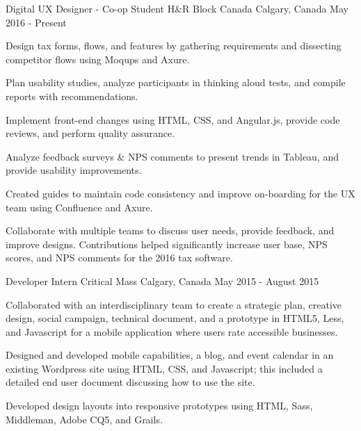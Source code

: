 
\begin{cventries}

  \cventry
    {Digital UX Designer - Co-op Student}
    {H\&R Block Canada}
    {Calgary, Canada}
    {May 2016 - Present}
    {
      \begin{cvitems}
        \item {Design tax forms, flows, and features by gathering requirements and dissecting competitor flows using Moqups and Axure.}
        \item {Plan usability studies, analyze participants in thinking aloud tests, and compile reports with recommendations.}
        \item {Implement front-end changes using HTML, CSS, and Angular.js, provide code reviews, and perform quality assurance.}
        \item {Analyze feedback surveys \& NPS comments to present trends in Tableau, and provide usability improvements.}
        \item {Created guides to maintain code consistency and improve on-boarding for the UX team using Confluence and Axure.}
        \item {Collaborate with multiple teams to discuss user needs, provide feedback, and improve designs. Contributions helped significantly increase user base, NPS scores, and NPS comments for the 2016 tax software.}
      \end{cvitems}
    }

  \cventry
    {Developer Intern}
    {Critical Mass}
    {Calgary, Canada}
    {May 2015 - August 2015}
    {
      \begin{cvitems}
        \item {Collaborated with an interdisciplinary team to create a strategic plan, creative design, social campaign, technical document, and a prototype in HTML5, Less, and Javascript for a mobile application where users rate accessible businesses.}
        \item {Designed and developed mobile capabilities, a blog, and event calendar in an existing Wordpress site using HTML, CSS, and Javascript; this included a detailed end user document discussing how to use the site.}
        \item {Developed design layouts into responsive prototypes using HTML, Sass, Middleman, Adobe CQ5, and Grails.}
      \end{cvitems}
    }


\end{cventries}
